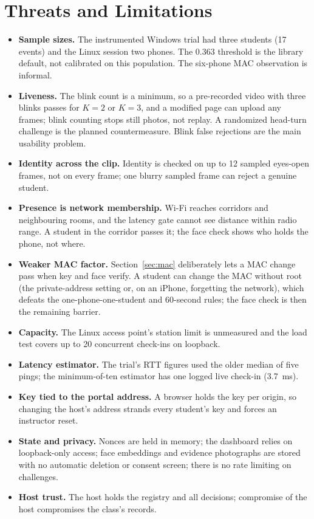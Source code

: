 \documentclass[11pt,a4paper]{article}
\begin{document}
\section{Threats and Limitations}\label{sec:limits}
\begin{itemize}[leftmargin=*,itemsep=2pt]
\item \textbf{Sample sizes.} The instrumented Windows trial had three students (17 events) and the Linux session two phones. The 0.363 threshold is the library default, not calibrated on this population. The six-phone MAC observation is informal.
\item \textbf{Liveness.} The blink count is a minimum, so a pre-recorded video with three blinks passes for $K=2$ or $K=3$, and a modified page can upload any frames; blink counting stops still photos, not replay. A randomized head-turn challenge is the planned countermeasure. Blink false rejections are the main usability problem.
\item \textbf{Identity across the clip.} Identity is checked on up to 12 sampled eyes-open frames, not on every frame; one blurry sampled frame can reject a genuine student.
\item \textbf{Presence is network membership.} Wi-Fi reaches corridors and neighbouring rooms, and the latency gate cannot see distance within radio range. A student in the corridor passes it; the face check shows who holds the phone, not where.
\item \textbf{Weaker MAC factor.} Section~\ref{sec:mac} deliberately lets a MAC change pass when key and face verify. A student can change the MAC without root (the private-address setting or, on an iPhone, forgetting the network), which defeats the one-phone-one-student and 60-second rules; the face check is then the remaining barrier.
\item \textbf{Capacity.} The Linux access point's station limit is unmeasured and the load test covers up to 20 concurrent check-ins on loopback.
\item \textbf{Latency estimator.} The trial's RTT figures used the older median of five pings; the minimum-of-ten estimator has one logged live check-in (3.7~ms).
\item \textbf{Key tied to the portal address.} A browser holds the key per origin, so changing the host's address strands every student's key and forces an instructor reset.
\item \textbf{State and privacy.} Nonces are held in memory; the dashboard relies on loopback-only access; face embeddings and evidence photographs are stored with no automatic deletion or consent screen; there is no rate limiting on challenges.
\item \textbf{Host trust.} The host holds the registry and all decisions; compromise of the host compromises the class's records.
\end{itemize}
\end{document}
